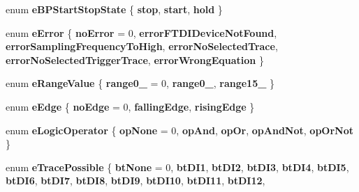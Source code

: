 \begin{DoxyCompactItemize}
enum {\bfseries e\+B\+P\+Start\+Stop\+State} \{ {\bfseries stop}, 
{\bfseries start}, 
{\bfseries hold}
 \}
\item 
\mbox{\label{class_global_enumated_and_extern_abf42bbd7759c59483b36948df532e257}} 
enum {\bfseries e\+Error} \{ \newline
{\bfseries no\+Error} = 0, 
{\bfseries error\+F\+T\+D\+I\+Device\+Not\+Found}, 
{\bfseries error\+Sampling\+Frequency\+To\+High}, 
{\bfseries error\+No\+Selected\+Trace}, 
\newline
{\bfseries error\+No\+Selected\+Trigger\+Trace}, 
{\bfseries error\+Wrong\+Equation}
 \}
\item 
\mbox{\label{class_global_enumated_and_extern_a7e2fec4711fb87e6409006c948a3ad10}} 
enum {\bfseries e\+Range\+Value} \{ {\bfseries range0\+\_} = 0, 
{\bfseries range0\+\_}, 
{\bfseries range15\+\_}
 \}
\item 
\mbox{\label{class_global_enumated_and_extern_a5da84856dc8ab66a8de348f3c579e112}} 
enum {\bfseries e\+Edge} \{ {\bfseries no\+Edge} = 0, 
{\bfseries falling\+Edge}, 
{\bfseries rising\+Edge}
 \}
\item 
\mbox{\label{class_global_enumated_and_extern_a732c770ea64278ee922e069c2f7f8db1}} 
enum {\bfseries e\+Logic\+Operator} \{ \newline
{\bfseries op\+None} = 0, 
{\bfseries op\+And}, 
{\bfseries op\+Or}, 
{\bfseries op\+And\+Not}, 
\newline
{\bfseries op\+Or\+Not}
 \}
\item 
\mbox{\label{class_global_enumated_and_extern_a54aa06ee800cb5fb68acf11bb2bd96bc}} 
enum {\bfseries e\+Trace\+Possible} \{ \newline
{\bfseries bt\+None} = 0, 
{\bfseries bt\+D\+I1}, 
{\bfseries bt\+D\+I2}, 
{\bfseries bt\+D\+I3}, 
\newline
{\bfseries bt\+D\+I4}, 
{\bfseries bt\+D\+I5}, 
{\bfseries bt\+D\+I6}, 
{\bfseries bt\+D\+I7}, 
\newline
{\bfseries bt\+D\+I8}, 
{\bfseries bt\+D\+I9}, 
{\bfseries bt\+D\+I10}, 
{\bfseries bt\+D\+I11}, 
\newline
{\bfseries bt\+D\+I12}, 

\end{DoxyCompactItemize}
